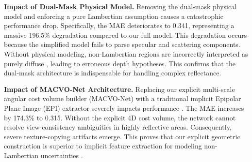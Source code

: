 \documentclass[lettersize,journal]{IEEEtran}
\begin{document}
\begin{table}[htbp]
  \centering
  \caption{Ablation study results on the validation set. The best results are highlighted in \textbf{bold}.}
  \label{tab:ablation}
\end{table}

\textbf{Impact of Dual-Mask Physical Model.} Removing the dual-mask physical model and enforcing a pure Lambertian assumption causes a catastrophic performance drop. Specifically, the MAE deteriorates to 0.341, representing a massive 196.5\% degradation compared to our full model. This degradation occurs because the simplified model fails to parse specular and scattering components. Without physical modeling, non-Lambertian regions are incorrectly interpreted as purely diffuse \cite{blinn1977}, leading to erroneous depth hypotheses. This confirms that the dual-mask architecture is indispensable for handling complex reflectance.

\textbf{Impact of MACVO-Net Architecture.} Replacing our explicit multi-scale angular cost volume builder (MACVO-Net) with a traditional implicit Epipolar Plane Image (EPI) extractor severely impacts performance \cite{heber2018}. The MAE increases by 174.3\% to 0.315. Without the explicit 4D cost volume, the network cannot resolve view-consistency ambiguities in highly reflective areas. Consequently, severe texture-copying artifacts emerge. This proves that our explicit geometric construction is superior to implicit feature extraction for modeling non-Lambertian uncertainties \cite{wanner2014}.
\end{document}
